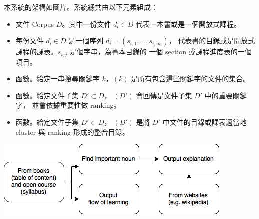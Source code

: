 本系統的架構如圖片。系統總共由以下元素組成：

\begin{itemize}
  \item 文件 Corpus $D$。其中一份文件 $d_i\in D$ 代表一本書或是一個開放式課程。
  \item 每份文件 $d_i\in D$ 是一個序列 $d_i = (s_{i,1},\dots,s_{i,m_i})$，
        代表書的目錄或是開放式課程的課表。$s_{i,j}$ 是個字串，為書本目錄的
        一個 section 或課程進度表的一個項目。
  \item {} 函數。給定一串搜尋關鍵字 $k$，$(k)$
        是所有包含這些關鍵字的文件的集合。
  \item {} 函數。給定文件子集 $D'\subset D$，
        $(D')$ 會回傳是文件子集 $D'$ 中的重要關鍵字，
        並會依據重要性做 ranking。
  \item {} 函數。給定文件子集 $D'\subset D$，
        $(D')$ 是將 $D'$ 中文件的目錄或課表適當地 cluster
        與 ranking 形成的整合目錄。
\end{itemize}

\includegraphics[scale=0.55]{./diagram.png}

